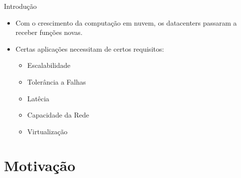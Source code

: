\documentclass[aspectratio=169]{beamer}
\begin{document}
        
    \begin{frame} {Introdução}
        
         \begin{itemize}
         \setlength\itemsep{2em}
            \Large
            \item
                Com o crescimento da computação em nuvem, os datacenters passaram a receber funções novas.
                
             \item
                Certas aplicações necessitam de certos requisitos:
            \begin{itemize}
                \item
                    Escalabilidade
            
                \item
                    Tolerância a Falhas
                \item
                    Latêcia
                    
                 \item
                    Capacidade da Rede
                 \item
                    Virtualização               
            \end{itemize}
                    
         \end{itemize}
        
    \end{frame}


\section{Motivação} 
\end{document}
